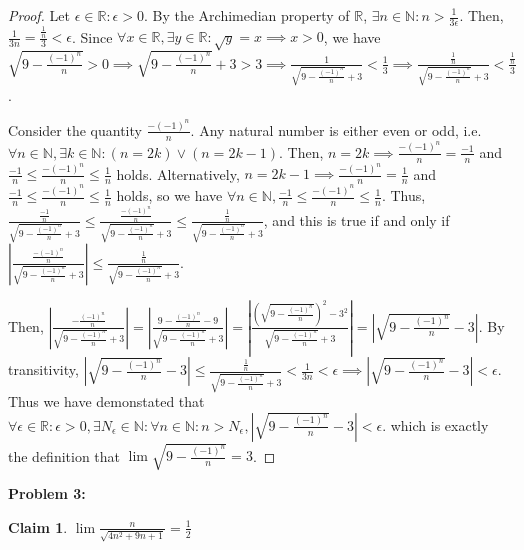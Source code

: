 \documentclass{article}
\newcommand{\reals}{\ensuremath{\mathbb{R}}}
\newcommand{\nats}{\ensuremath{\mathbb{N}}}
\newcommand{\eps}{\ensuremath{\epsilon}}
\newcommand{\neps}{\ensuremath{N_\epsilon}}
\newcommand{\overn}[1]{\ensuremath{\frac{#1}{n}}}
\newcommand{\movern}{\overn{(-1)^n}}
\newcommand{\bsn}{\sqrt{9-\movern}}
\newcommand{\csn}{\sqrt{4n^2+9n+1}}
\newtheorem{clm}{Claim}
\begin{document}
\begin{proof}
	Let $\eps \in \reals: \eps > 0$.
	By the Archimedian property of \reals,
	$\exists n \in \nats: n > \frac{1}{3\eps}$.
	Then, $\frac{1}{3n} = \frac{\overn{1}}{3}< \eps$.
	Since $\forall x \in \reals, \exists y \in \reals: \sqrt{y}=x \implies x > 0$,
	we have $\bsn > 0 \implies \bsn + 3 > 3 \implies \frac{1}{\bsn + 3} < \frac{1}{3}
	\implies \frac{\overn{1}}{\bsn + 3} < \frac{\overn{1}}{3}$.

	Consider the quantity $\overn{-(-1)^n}$.
	Any natural number is either even or odd, i.e.
	$\forall n \in \nats, \exists k \in \nats: (n = 2k) \lor (n = 2k-1)$.
	Then, $n = 2k \implies \overn{-(-1)^n} = \overn{-1}$
	and $\overn{-1} \le \overn{-(-1)^n} \le \overn{1}$ holds.
	Alternatively, $n = 2k-1 \implies \overn{-(-1)^n} = \overn{1}$
	and $\overn{-1} \le \overn{-(-1)^n} \le \overn{1}$ holds,
	so we have $\forall n \in \nats, \overn{-1} \le \overn{-(-1)^n} \le \overn{1}$.
	Thus, $\frac{\overn{-1}}{\bsn + 3} \le \frac{\overn{-(-1)^n}}{\bsn + 3} \le \frac{\overn{1}}{\bsn + 3}$,
	and this is true if and only if
	$|\frac{\overn{-(-1)^n}}{\bsn + 3}| \le \frac{\overn{1}}{\bsn + 3}$.

	Then, $|\frac{-\movern}{\bsn + 3}| = |\frac{9-\movern-9}{\bsn + 3}| =
	|\frac{(\bsn)^2-3^2}{\bsn + 3}| = |\bsn - 3|$.
	By transitivity, $|\bsn - 3| \le \frac{\overn{1}}{\bsn + 3} < \frac{1}{3n} < \eps
	\implies |\bsn - 3| < \eps$.
	Thus we have demonstated that $\forall \eps \in \reals : \eps > 0, \exists \neps \in \nats:
	\forall n \in \nats: n > \neps,
	|\bsn - 3| < \eps$.
	which is exactly the definition that
	$\lim \sqrt{9-\frac{(-1)^n}{n}} = 3$.
\end{proof}

\textbf{Problem 3:}

\begin{clm} \label{c3}
	$\lim \frac{n}{\csn} = \frac{1}{2}$
\end{clm}
\end{document}
